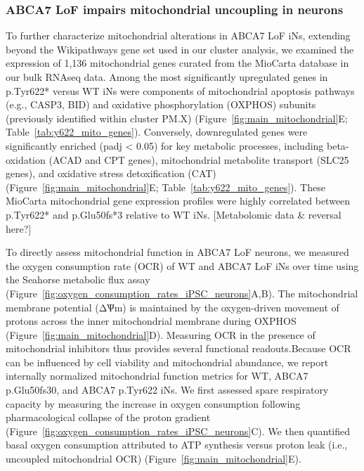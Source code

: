 \subsubsection{ABCA7 LoF impairs mitochondrial uncoupling in neurons}
To further characterize mitochondrial alterations in ABCA7 LoF iNs, extending beyond the Wikipathways gene set used in our cluster analysis, we examined the expression of 1,136 mitochondrial genes curated from the MioCarta database in our bulk RNAseq data. Among the most significantly upregulated genes in p.Tyr622* versus WT iNs were components of mitochondrial apoptosis pathways (e.g., CASP3, BID) and oxidative phosphorylation (OXPHOS) subunits (previously identified within cluster PM.X) (Figure~\ref{fig:main_mitochondrial}E; Table~\ref{tab:y622_mito_genes}). Conversely, downregulated genes were significantly enriched (padj < 0.05) for key metabolic processes, including beta-oxidation (ACAD and CPT genes), mitochondrial metabolite transport (SLC25 genes), and oxidative stress detoxification (CAT) (Figure~\ref{fig:main_mitochondrial}E; Table~\ref{tab:y622_mito_genes}). These MioCarta mitochondrial gene expression profiles were highly correlated between p.Tyr622* and p.Glu50fs*3 relative to WT iNs. [Metabolomic data & reversal here?]

To directly assess mitochondrial function in ABCA7 LoF neurons, we measured the oxygen consumption rate (OCR) of WT and ABCA7 LoF iNs over time using the Seahorse metabolic flux assay (Figure~\ref{fig:oxygen_consumption_rates_iPSC_neurons}A,B). The mitochondrial membrane potential (ΔѰm) is maintained by the oxygen-driven movement of protons across the inner mitochondrial membrane during OXPHOS (Figure~\ref{fig:main_mitochondrial}D). Measuring OCR in the presence of mitochondrial inhibitors thus provides several functional readouts.Because OCR can be influenced by cell viability and mitochondrial abundance\cite{Divakaruni2014-eq,Gu2021-ms}, we report internally normalized mitochondrial function metrics\cite{Divakaruni2022-rj} for WT, ABCA7 p.Glu50fs30, and ABCA7 p.Tyr622 iNs. We first assessed spare respiratory capacity by measuring the increase in oxygen consumption following pharmacological collapse of the proton gradient\cite{Divakaruni2022-rj} (Figure~\ref{fig:oxygen_consumption_rates_iPSC_neurons}C). We then quantified basal oxygen consumption attributed to ATP synthesis versus proton leak (i.e., uncoupled mitochondrial OCR)\cite{Divakaruni2014-eq} (Figure~\ref{fig:main_mitochondrial}E).

